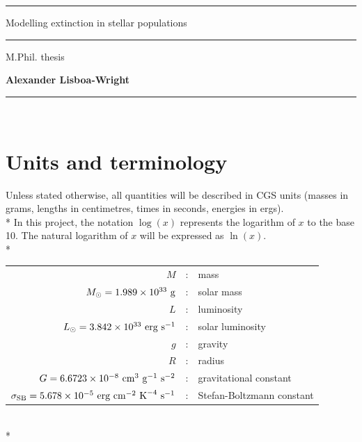\documentclass[12pt, a4paper]{report}
\begin{document}
\begin{titlepage}

\vspace*{-0.4cm}

\begin{center}
\hrule
\vspace*{0.5cm}
{\Huge \sc Modelling extinction in stellar populations \par}
\vspace*{0.5cm}
\hrule

\vspace*{5mm}
{\normalsize M.Phil. thesis}

\vfill

{\bf Alexander Lisboa-Wright}

\end{center}

\vspace*{1.0cm}

\hrule
\vspace*{0.2cm}
\\

\end{titlepage}

\begin{abstract}
\end{abstract}

\chapter{Units and terminology}
Unless stated otherwise, all quantities will be described in CGS units (masses in grams, lengths in centimetres, times in seconds, energies in ergs). \\*
In this project, the notation $\log(x)$ represents the logarithm of $x$ to the base 10. The natural logarithm of $x$ will be expressed as $\ln(x)$. \\*

\begin{tabular}{r@{ }c@{ }l}
$M$ &:& mass\\
$M_{\odot} = 1.989 \times 10^{33} \textnormal{ g}$ &:& solar mass\\
$L$ &:& luminosity\\
$L_{\odot} = 3.842 \times 10^{33} \textnormal{ erg s}^{-1}$ &:& solar luminosity\\
$g$ &:& gravity\\
$R$ &:& radius\\
$G = 6.6723 \times 10^{-8} \textnormal{ cm}^{3} \textnormal{ g}^{-1} \textnormal{ s}^{-2}$ &:& gravitational constant\\
$\sigma_{\textnormal{SB}} = 5.678 \times 10^{-5} \textnormal{ erg cm}^{-2} \textnormal{ K}^{-4} \textnormal{ s}^{-1}$ & : & Stefan-Boltzmann constant\\
\end{tabular}
\\*
\end{document}
